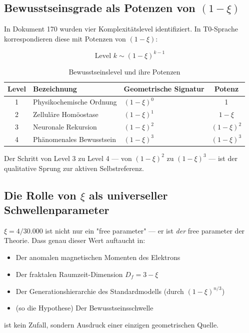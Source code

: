 \documentclass[11pt,a4paper]{article}
\begin{document}
	\subsection{Bewusstseinsgrade als Potenzen von \((1-\xi)\)}
	
	In Dokument 170 wurden vier Komplexitätslevel identifiziert. In T0-Sprache korrespondieren diese mit Potenzen von \((1-\xi)\):
	
	\[
	\text{Level } k \sim (1-\xi)^{k-1}
	\]
	
	\begin{table}[h]
		\centering
		\caption{Bewusstseinslevel und ihre Potenzen}
		\begin{tabular}{cllc}
			\toprule
			\textbf{Level} & \textbf{Bezeichnung} & \textbf{Geometrische Signatur} & \textbf{Potenz} \\
			\midrule
			1 & Physikochemische Ordnung & \((1-\xi)^0\) & 1 \\
			2 & Zelluläre Homöostase & \((1-\xi)^1\) & \(1-\xi\) \\
			3 & Neuronale Rekursion & \((1-\xi)^2\) & \((1-\xi)^2\) \\
			4 & Phänomenales Bewusstsein & \((1-\xi)^3\) & \((1-\xi)^3\) \\
			\bottomrule
		\end{tabular}
	\end{table}
	
	\begin{keybox}
		Der Schritt von Level 3 zu Level 4 — von \((1-\xi)^2\) zu \((1-\xi)^3\) — ist der qualitative Sprung zur aktiven Selbstreferenz.
	\end{keybox}
	
	\subsection{Die Rolle von \(\xi\) als universeller Schwellenparameter}
	
	\(\xi = 4/30.000\) ist nicht nur ein "free parameter" — er ist \emph{der} free parameter der Theorie. Dass genau dieser Wert auftaucht in:
	\begin{itemize}
		\item Der anomalen magnetischen Momenten des Elektrons
		\item Der fraktalen Raumzeit-Dimension \(D_f = 3 - \xi\)
		\item Der Generationshierarchie des Standardmodells (durch \((1-\xi)^{n/3}\))
		\item (so die Hypothese) Der Bewusstseinsschwelle
	\end{itemize}
	ist kein Zufall, sondern Ausdruck einer einzigen geometrischen Quelle.
	
\end{document}
